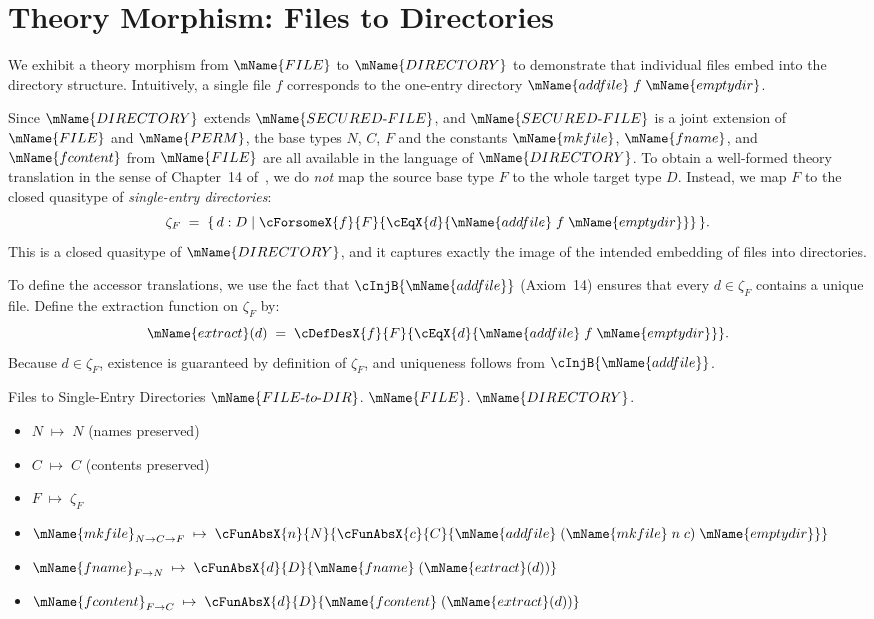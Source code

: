 \documentclass[11pt]{article}
\newcommand{\PERM}{\mName{PERM}}
\newcommand{\FILETYPE}{\mName{FILE}}
\newcommand{\SECFILE}{\mName{SECURED\text{-}FILE}}
\newcommand{\DIR}{\mName{DIRECTORY}}
\newcommand{\mkfile}{\mName{mkfile}}
\newcommand{\fname}{\mName{fname}}
\newcommand{\fcontent}{\mName{fcontent}}
\begin{document}
\newpage
\section{Theory Morphism: Files to Directories}
\label{sec:morphism}

We exhibit a theory morphism from $\FILETYPE$ to $\DIR$ to
demonstrate that individual files embed into the directory
structure.  Intuitively, a single file $f$ corresponds to the
one-entry directory $\mName{addfile}\;f\;\mName{emptydir}$.

Since $\DIR$ extends $\SECFILE$, and $\SECFILE$ is a joint
extension of $\FILETYPE$ and $\PERM$, the base types $N$, $C$, $F$
and the constants $\mkfile$, $\fname$, and $\fcontent$ from
$\FILETYPE$ are all available in the language of $\DIR$.  To obtain a
well-formed theory translation in the sense of Chapter~14
of~\cite{farmer2025}, we do \emph{not} map the source base type
$F$ to the whole target type $D$.  Instead, we map $F$ to the
closed quasitype of \emph{single-entry directories}:
\[
  \zeta_F \;=\;
  \{\, d : D \mid \cForsomeX{f}{F}{
      \cEqX{d}{\mName{addfile}\;f\;\mName{emptydir}}}\,\}.
\]
This is a closed quasitype of $\DIR$, and it captures exactly the
image of the intended embedding of files into directories.

To define the accessor translations, we use the fact that
$\cInjB{\mName{addfile}}$ (Axiom~14) ensures that every
$d \in \zeta_F$ contains a unique file.  Define the extraction
function on $\zeta_F$ by:
\[
  \mName{extract}(d) \;=\;
  \cDefDesX{f}{F}{
    \cEqX{d}{\mName{addfile}\;f\;\mName{emptydir}}}.
\]
Because $d \in \zeta_F$, existence is guaranteed by definition of
$\zeta_F$, and uniqueness follows from $\cInjB{\mName{addfile}}$.

\begin{theory-trans-def}
{Files to Single-Entry Directories}
{$\mName{FILE\text{-}to\text{-}DIR}$.}
{$\FILETYPE$.}
{$\DIR$.}
{%
\begin{itemize}
  \item[] $N \;\mapsto\; N$ \quad (names preserved)
  \item[] $C \;\mapsto\; C$ \quad (contents preserved)
  \item[] $F \;\mapsto\; \zeta_F$
\end{itemize}
}
{%
\begin{itemize}
  \item[] $\mkfile_{N \to C \to F} \;\mapsto\;
    \cFunAbsX{n}{N}{\cFunAbsX{c}{C}{
      \mName{addfile}\;(\mkfile\;n\;c)\;\mName{emptydir}}}$

  \item[] $\fname_{F \to N} \;\mapsto\;
    \cFunAbsX{d}{D}{\fname\;(\mName{extract}(d))}$

  \item[] $\fcontent_{F \to C} \;\mapsto\;
    \cFunAbsX{d}{D}{\fcontent\;(\mName{extract}(d))}$
\end{itemize}
}
\end{theory-trans-def}
\end{document}
